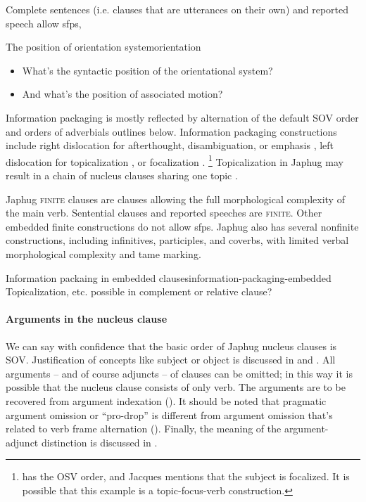 \documentclass[a4paper, oneside, 12pt]{report}
\newcommand*{\citesec}[1]{\S~{#1}}
\newcommand*{\citepage}[1]{p.~{#1}}
\newcommand{\category}[1]{\textsc{#1}}
\begin{document}
Complete sentences (i.e. clauses that are utterances on their own)
and reported speech \citep[\citesec{24.2.5.1}]{jacques2021grammar} allow \acp{sfp},

\begin{todobox}{The position of orientation system}{orientation}
    \begin{itemize}
        \item What's the syntactic position of the orientational system?
        \item And what's the position of associated motion?
    \end{itemize}
\end{todobox}

Information packaging is mostly reflected by alternation of 
the default SOV order and orders of adverbials outlines below.
Information packaging constructions include
right dislocation for afterthought, disambiguation, or emphasis 
\citep[\citesec{22.1.3}]{jacques2021grammar},
left dislocation for topicalization 
\citep[\citepage{1189}]{jacques2021grammar},
or focalization \citep[\citepage{1190}]{jacques2021grammar}.%
\footnote{
    \citep[\citepage{1190}]{jacques2021grammar} has the OSV order,
    and Jacques mentions that the subject is focalized.
    It is possible that this example is a topic-focus-verb construction.
}
Topicalization in Japhug may result in a chain of nucleus clauses sharing one topic
\citep[\citepage{1190}, (11)]{jacques2021grammar}.

Japhug \category{finite} clauses are clauses 
allowing the full morphological complexity of the main verb.
Sentential clauses and reported speeches are \category{finite}.
Other embedded finite constructions do not allow \acp{sfp}. 
Japhug also has several nonfinite constructions,
including infinitives, participles, and coverbs,
with limited verbal morphological complexity and \ac{tame} marking.  

\begin{todobox}{Information packaing in embedded clauses}{information-packaging-embedded}
    Topicalization, etc. possible in complement or relative clause?
\end{todobox}

\paragraph*{Arguments in the nucleus clause}\label{sec:grammatical.clause.template.arguments}
We can say with confidence that the basic order of Japhug nucleus clauses is SOV.
Justification of concepts like subject or object is discussed in 
 and .
All arguments -- and of course adjuncts -- of clauses can be omitted;
in this way it is possible that the nucleus clause consists of only verb.
The arguments are to be recovered from argument indexation
().
It should be noted that pragmatic argument omission or ``pro-drop''
is different from argument omission that's related to verb frame alternation 
().
Finally, the meaning of the argument-adjunct distinction is discussed in 
.
\end{document}

